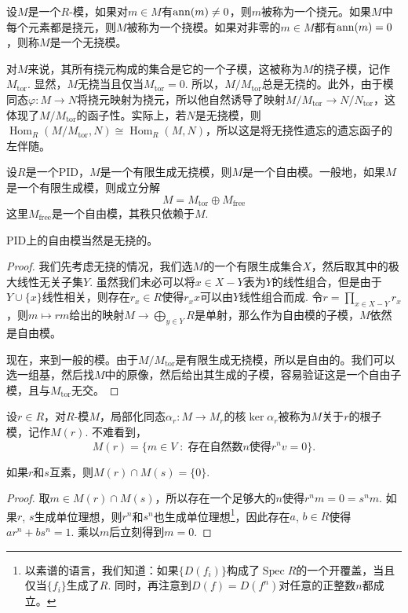 \begin{para}[挠元、挠模]
	设$M$是一个$R$-模，如果对$m\in M$有$\operatorname{ann}(m)\neq 0$，则$m$被称为一个挠元。如果$M$中每个元素都是挠元，则$M$被称为一个挠模。如果对非零的$m\in M$都有$\operatorname{ann}(m)=0$，则称$M$是一个无挠模。
\end{para}

对$M$来说，其所有挠元构成的集合是它的一个子模，这被称为$M$的挠子模，记作$M_{\text{tor}}$. 显然，$M$无挠当且仅当$M_{\text{tor}}=0$. 所以，$M/M_{\text{tor}}$总是无挠的。此外，由于模同态$\varphi:M\to N$将挠元映射为挠元，所以他自然诱导了映射$M/M_{\text{tor}}\to N/N_{\text{tor}}$，这体现了$M/M_{\text{tor}}$的函子性。实际上，若$N$是无挠模，则$\operatorname{Hom}_{R}(M/M_{\text{tor}},N)\cong \operatorname{Hom}_{R}(M,N)$，所以这是将无挠性遗忘的遗忘函子的左伴随。

\begin{pro}
	设$R$是一个PID，$M$是一个有限生成无挠模，则$M$是一个自由模。一般地，如果$M$是一个有限生成模，则成立分解
    \[
        M=M_{\mathrm{tor}}\oplus M_{\mathrm{free}}
    \]
    这里$M_{\mathrm{free}}$是一个自由模，其秩只依赖于$M$.
\end{pro}

PID上的自由模当然是无挠的。

\begin{proof}
	我们先考虑无挠的情况，我们选$M$的一个有限生成集合$X$，然后取其中的极大线性无关子集$Y$. 虽然我们未必可以将$x\in X-Y$表为$Y$的线性组合，但是由于$Y\cup \{x\}$线性相关，则存在$r_x\in R$使得$r_xx$可以由$Y$线性组合而成. 令$r=\prod_{x\in X-Y}r_x$，则$m\mapsto rm$给出的映射$M\to \bigoplus_{y\in Y}R$是单射，那么作为自由模的子模，$M$依然是自由模。

    现在，来到一般的模。由于$M/M_{\mathrm{tor}}$是有限生成无挠模，所以是自由的。我们可以选一组基，然后找$M$中的原像，然后给出其生成的子模，容易验证这是一个自由子模，且与$M_{\mathrm{tor}}$无交。
\end{proof}

\begin{para}[根子模]
    设$r\in R$，对$R$-模$M$，局部化同态$\alpha_r:M\to M_r$的核$\ker \alpha_r$被称为$M$关于$r$的根子模，记作$M(r)$. 不难看到，
    \[
        M(r)=\{m\in V\;:\; \text{存在自然数$n$使得$r^nv=0$}\}.
    \]
\end{para}

\begin{lem}
    如果$r$和$s$互素，则$M(r)\cap M(s)=\{0\}$.
\end{lem}

\begin{proof}
    取$m\in M(r)\cap M(s)$，所以存在一个足够大的$n$使得$r^nm=0=s^nm$. 如果$r$, $s$生成单位理想，则$r^{n}$和$s^{n}$也生成单位理想\footnote{以素谱的语言，我们知道：如果$\{D(f_i)\}$构成了$\operatorname{Spec} R$的一个开覆盖，当且仅当$\{f_i\}$生成了$R$. 同时，再注意到$D(f)=D(f^n)$对任意的正整数$n$都成立。}，因此存在$a$, $b\in R$使得$ar^{n}+bs^{n}=1$. 乘以$m$后立刻得到$m=0$.
\end{proof}

